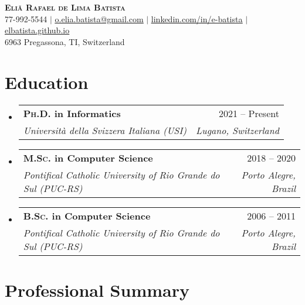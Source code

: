\documentclass[letterpaper,11pt]{article}
\makeatletter
\newcommand{\resumeSubheading}[4]{
  \vspace{-2pt}\item
    \begin{tabular*}{0.97\textwidth}[t]{l@{\extracolsep{\fill}}r}
      \textbf{#1} & #2 \\
      \textit{\small#3} & \textit{\small #4} \\
    \end{tabular*}\vspace{-7pt}
}
\newcommand{\resumeSubHeadingListStart}{\begin{itemize}[leftmargin=0.15in, label={}]}
\newcommand{\resumeSubHeadingListEnd}{\end{itemize}}
\makeatother
\begin{document}

\begin{center}
    \textbf{\huge \scshape Eliã Rafael de Lima Batista} \\ \vspace{15pt}
    \small 77-992-5544 $|$ \href{mailto:o.elia.batista@gmail.com}{\underline{o.elia.batista@gmail.com}} $|$ 
    \href{https://www.linkedin.com/in/e-batista}{\underline{linkedin.com/in/e-batista}} $|$
    \href{https://elbatista.github.io}{\underline{elbatista.github.io}} \\
    \vspace{5pt}
    \small 6963 Pregassona, TI, Switzerland
\end{center}

\vspace{2pt}

\section{Education}
  \resumeSubHeadingListStart
    \resumeSubheading
      {\textsc{Ph.D.} in Informatics}{2021 -- Present}
      {Università della Svizzera Italiana (USI)}{Lugano, Switzerland}
      \resumeSubheading
      {\textsc{M.Sc.} in Computer Science}{2018 -- 2020}
      {Pontifical Catholic University of Rio Grande do Sul (PUC-RS)}{Porto Alegre, Brazil}
\resumeSubheading
      {\textsc{B.Sc.} in Computer Science}{2006 -- 2011}
      {Pontifical Catholic University of Rio Grande do Sul (PUC-RS)}{Porto Alegre, Brazil}

  \resumeSubHeadingListEnd


  \vspace{2pt}

  \section{Professional Summary}
\end{document}
